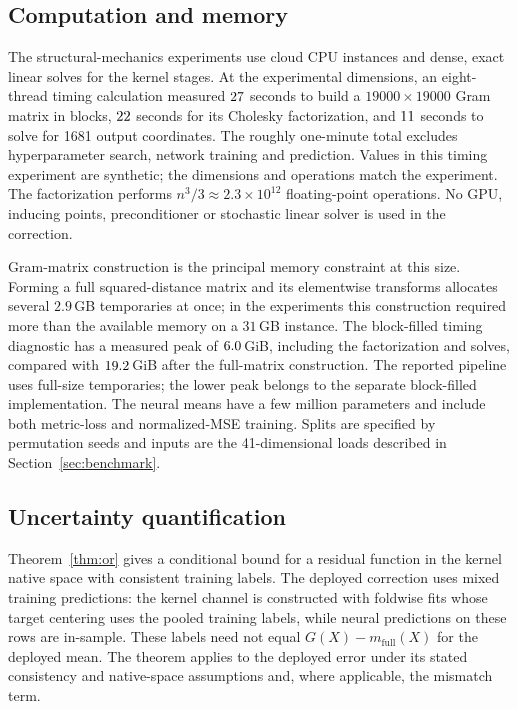 \subsection{Computation and memory}
\label{sec:cost}
The structural-mechanics experiments use cloud CPU instances and dense,
exact linear solves for the kernel stages. At the experimental
dimensions, an eight-thread timing calculation measured $27$ seconds to
build a $19000\times19000$ Gram matrix in blocks, $22$ seconds for its
Cholesky factorization, and $11$ seconds to solve for 1681 output
coordinates. The roughly one-minute total excludes hyperparameter search,
network training and prediction. Values in this timing experiment are
synthetic; the dimensions and operations match the experiment. The factorization
performs $n^3/3\approx2.3\times10^{12}$ floating-point operations. No GPU, inducing points, preconditioner or
stochastic linear solver is used in the correction.

Gram-matrix construction is the principal memory constraint at this size.
Forming a full squared-distance matrix and its
elementwise transforms allocates several $2.9$\,GB temporaries at once;
in the experiments this construction required more than the available
memory on a $31$\,GB instance. The block-filled timing
diagnostic has a measured peak of $6.0$\,GiB, including the
factorization and solves, compared with $19.2$\,GiB after the
full-matrix construction. The reported pipeline uses full-size temporaries; the lower peak belongs
to the separate block-filled implementation. The neural means have a few million parameters and include both metric-loss
and normalized-MSE training. Splits are specified by permutation seeds and
inputs are the 41-dimensional loads described in Section~\ref{sec:benchmark}.

\subsection{Uncertainty quantification}
Theorem~\ref{thm:or} gives a conditional bound for a residual function in the
kernel native space with consistent training labels. The deployed correction
uses mixed training predictions: the kernel channel is constructed with
foldwise fits whose target centering uses the pooled training labels, while
neural predictions on these rows are in-sample. These labels need not equal
$G(X)-m_{\mathrm{full}}(X)$ for the deployed mean. The theorem applies to the deployed error under its stated consistency
and native-space assumptions and, where applicable, the mismatch term.

